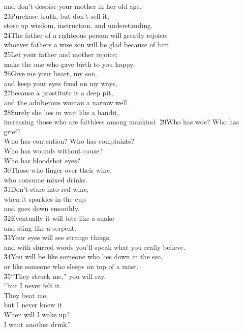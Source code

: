 \begin{poetry}
\poemll    and don't despise your mother in her old age. \\
\poeml \v{23}Purchase truth, but don't sell it; \\
\poemll    store up wisdom, instruction, and understanding. \\
\poeml \v{24}The father of a righteous person will greatly rejoice; \\
\poemll    whoever fathers a wise son will be glad because of him. \\
\poeml \v{25}Let your father and mother rejoice; \\
\poemll    make the one who gave birth to you happy. \\
\poeml \v{26}Give me your heart, my son, \\
\poemll    and keep your eyes fixed on my ways, \\
\poeml \v{27}because a prostitute is a deep pit, \\
\poemll    and the adulterous woman a narrow well. \\
\poeml \v{28}Surely she lies in wait like a bandit, \\
\poemll    increasing those who are faithless among mankind.
\poeml \v{29}Who has woe? Who has grief? \\
\poemll    Who has contention? Who has complaints? \\
\poeml Who has wounds without cause? \\
\poemll    Who has bloodshot eyes? \\
\poeml \v{30}Those who linger over their wine, \\
\poemll    who consume mixed drinks. \\
\poeml \v{31}Don't stare into red wine, \\
\poemll    when it sparkles in the cup \\
\poemlll       and goes down smoothly. \\
\poeml \v{32}Eventually it will bite like a snake \\
\poemll    and sting like a serpent. \\
\poeml \v{33}Your eyes will see strange things, \\
\poemll    and with slurred words you'll speak what you really believe. \\
\poeml \v{34}You will be like someone who lies down in the sea, \\
\poemll    or like someone who sleeps on top of a mast. \\
\poeml \v{35}``They struck me,'' you will say, \\
\poemll    ``but I never felt it. \\
\poeml They beat me, \\
\poemll    but I never knew it \\
\poeml When will I wake up? \\
\poemll    I want another drink.''
\end{poetry}

